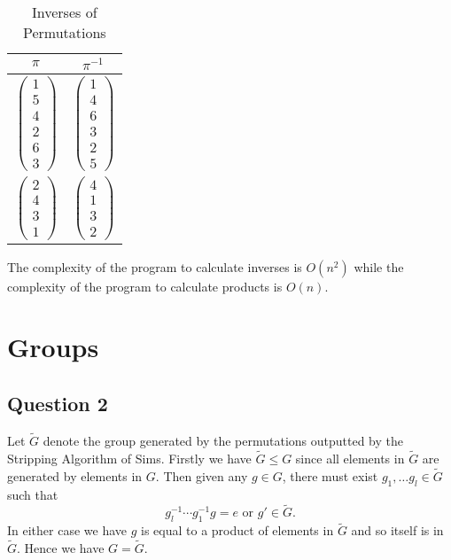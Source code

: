 \documentclass{article}
\begin{document}
\begin{table}[hp]
\begin{center}
\begin{tabular}{|c|c|}
\hline
$\pi$           & $\pi^{-1}$      \\ \hline
$\begin{pmatrix}1\\ 5\\ 4\\ 2\\ 6\\ 3\end{pmatrix}$ & $\begin{pmatrix}1\\ 4\\ 6\\ 3\\ 2\\ 5\end{pmatrix}$ \\
$\begin{pmatrix}2\\ 4\\ 3\\ 1\end{pmatrix}$     & $\begin{pmatrix}4\\ 1\\ 3\\ 2\end{pmatrix}$    \\ \hline
\end{tabular}
\caption{Inverses of Permutations}
\end{center}
\end{table}



The complexity of the program to calculate inverses is $O(n^2)$ while the complexity of the program to calculate products is $O(n)$.

\section{Groups}
\subsection{Question 2}
Let $\tilde G$ denote the group generated by the permutations outputted by the Stripping Algorithm of Sims.  Firstly we have $\tilde G\leq G$ since all elements in $\tilde G$ are generated by elements in $G$.  Then given any $g\in G$,  there must exist $g_1,\ldots g_l\in \tilde G$ such that 
\[ g_l^{-1}\cdots g_1^{-1}g=e\text{ or } g'\in \tilde G.\]
In either case we have $g$ is equal to a product of elements in $\tilde G$ and so itself is in $\tilde G$.  Hence we have $G=\tilde G$.
\end{document}
